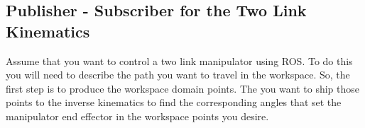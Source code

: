 \begin{Shaded}
\begin{Highlighting}[]
\OperatorTok{=} \StringTok{\textquotesingle{}} \OperatorTok{\%}
\OperatorTok{+=} 
 \OperatorTok{\%}


\OperatorTok{=}\NormalTok{)}
\OperatorTok{=}\NormalTok{)}
\OperatorTok{=}\NormalTok{)}

\OperatorTok{=}
\OperatorTok{=} 
\OperatorTok{=}   
\OperatorTok{=}


\end{Highlighting}
\end{Shaded}

\hypertarget{publisher---subscriber-for-the-two-link-kinematics}{%
\subsection{Publisher - Subscriber for the Two Link
Kinematics}\label{publisher---subscriber-for-the-two-link-kinematics}}

Assume that you want to control a two link manipulator using ROS. To do
this you will need to describe the path you want to travel in the
workspace. So, the first step is to produce the workspace domain points.
The you want to ship those points to the inverse kinematics to find the
corresponding angles that set the manipulator end effector in the
workspace points you desire.

